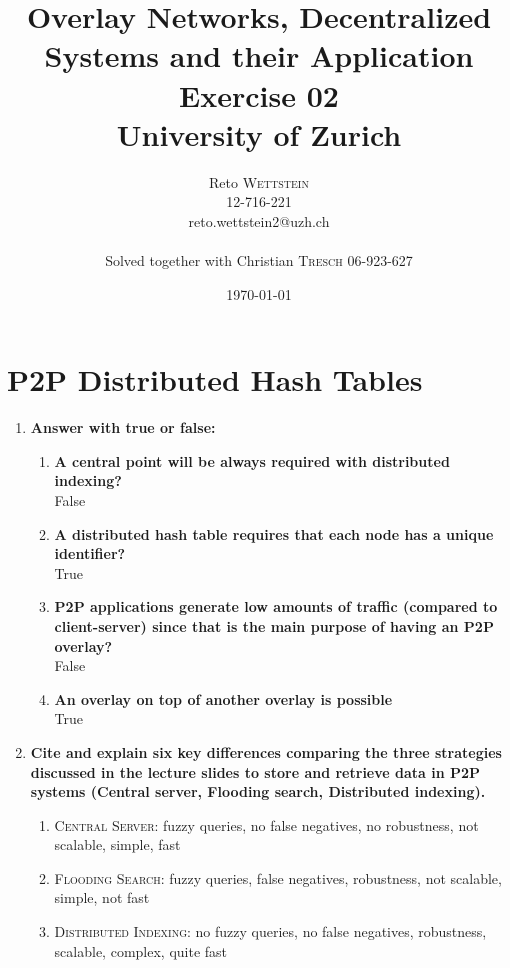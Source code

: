 \documentclass{article}
\title{\vspace{-50pt}\textbf{Overlay Networks, Decentralized Systems and their Application}\\ Exercise 02 \\ University of Zurich} %
\author{Reto \textsc{Wettstein}\\12-716-221\\reto.wettstein2@uzh.ch \\ \\ Solved together with Christian \textsc{Tresch} 06-923-627} %
\date{\today} %
\begin{document}
\maketitle %



\section{P2P Distributed Hash Tables}
\begin{enumerate}[1]
\item \textbf{Answer with true or false:}
\begin{enumerate}[1]
	  \item\textbf{A central point will be always required with distributed indexing?} \\ False 
      \item\textbf{A distributed hash table requires that each node has a unique identifier?} \\ True 
      \item\textbf{P2P applications generate low amounts of traffic (compared to client-server) since that is the main purpose of having an P2P overlay?} \\ False 
      \item\textbf{An overlay on top of another overlay is possible} \\ True \\
\end{enumerate}

\item \textbf{Cite and explain six key differences comparing the three strategies discussed in the lecture slides to store and retrieve data in P2P systems (Central server, Flooding search, Distributed indexing).}
\begin{enumerate}[]
	\item\textsc{Central Server}: fuzzy queries, no false negatives, no robustness, not scalable, simple, fast
	\item\textsc{Flooding Search}: fuzzy queries, false negatives, robustness, not scalable, simple, not fast
	\item\textsc{Distributed Indexing}: no fuzzy queries, no false negatives, robustness, scalable, complex, quite fast\\
\end{enumerate}


\end{enumerate}
\end{document}
